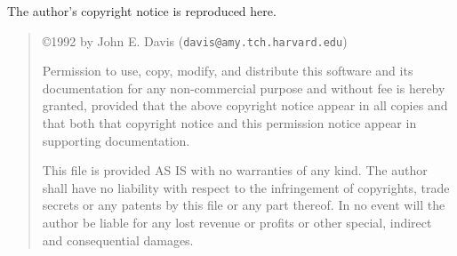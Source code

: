 The author's copyright notice is reproduced here.
\begin{quote}
\copyright 1992 by John E. Davis  ({\tt davis@amy.tch.harvard.edu})

Permission to use, copy, modify, and distribute this software and its
documentation for any non-commercial purpose and without fee is hereby
granted, provided that the above copyright notice appear in all copies
and that both that copyright notice and this permission notice appear in
supporting documentation.

This file is provided AS IS with no warranties of any kind.  The author
shall have no liability with respect to the infringement of copyrights,
trade secrets or any patents by this file or any part thereof.  In no
event will the author be liable for any lost revenue or profits or other
special, indirect and consequential damages. 
\end{quote}

